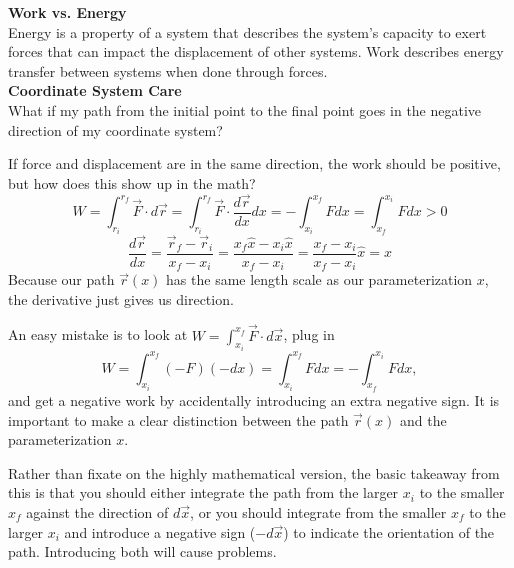 \documentclass[]{article}
\begin{document}
\begin{TeacherMargin}
\noindent\textbf{Work vs. Energy} \\
Energy is a property of a system that describes the system's capacity to exert forces that can impact the displacement of other systems. Work describes energy transfer between systems when done through forces. \\

\noindent\textbf{Coordinate System Care} \\
What if my path from the initial point to the final point goes in the negative direction of my coordinate system?
\begin{center}
\end{center}
If force and displacement are in the same direction, the work should be positive, but how does this show up in the math?
\[
W = \int_{r_{i}}^{r_{f}}\vec{F}\cdot d\vec{r} = \int_{r_{i}}^{r_{f}}\vec{F}\cdot \frac{d\vec{r}}{dx}dx = -\int_{x_{i}}^{x_{f}} Fdx = \int_{x_{f}}^{x_{i}}Fdx > 0
\]
\[
\frac{d\vec{r}}{dx} = \frac{\vec{r}_{f}-\vec{r}_{i}}{x_{f}-x_{i}} = \frac{x_{f}\hat{x}-x_{i}\hat{x}}{x_{f}-x_{i}} = \frac{x_{f}-x_{i}}{x_{f}-x_{i}}\hat{x} = \hat{x}
\]
Because our path $\vec{r}(x)$ has the same length scale as our parameterization $x$, the derivative just gives us direction.

An easy mistake is to look at $W=\int_{x_{i}}^{x_{f}}\vec{F}\cdot d\vec{x}$, plug in
\[
W = \int_{x_{i}}^{x_{f}}(-F)(-dx) = \int_{x_{i}}^{x_{f}}Fdx = -\int_{x_{f}}^{x_{i}}Fdx,
\]
and get a negative work by accidentally introducing an extra negative sign. It is important to make a clear distinction between the path $\vec{r}(x)$ and the parameterization $x$.

Rather than fixate on the highly mathematical version, the basic takeaway from this is that you should either integrate the path from the larger $x_{i}$ to the smaller $x_{f}$ against the direction of $d\vec{x}$, or you should integrate from the smaller $x_{f}$ to the larger $x_{i}$ and introduce a negative sign ($-d\vec{x}$) to indicate the orientation of the path. Introducing both will cause problems.
\end{TeacherMargin}
\end{document}
